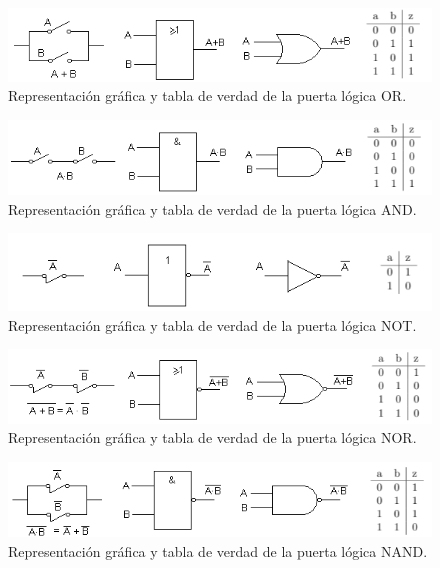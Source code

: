 \documentclass[a4paper, 11pt, titlepage]{article}
\begin{document}
    \begin{figure}[htp]
      \centering
      \includegraphics[width=1\textwidth]{resources/boole-or.png}
      \caption{Representación gráfica y tabla de verdad de la puerta lógica OR.}
      \label{boole-or}
    \end{figure}

    \begin{figure}[htp]
      \centering
      \includegraphics[width=1\textwidth]{resources/boole-and.png}
      \caption{Representación gráfica y tabla de verdad de la puerta lógica AND.}
      \label{boole-and}
    \end{figure}

    \begin{figure}[htp]
      \centering
      \includegraphics[width=1\textwidth]{resources/boole-not.png}
      \caption{Representación gráfica y tabla de verdad de la puerta lógica NOT.}
      \label{boole-not}
    \end{figure}

    \begin{figure}[htp]
      \centering
      \includegraphics[width=1\textwidth]{resources/boole-nor.png}
      \caption{Representación gráfica y tabla de verdad de la puerta lógica NOR.}
      \label{boole-nor}
    \end{figure}

    \begin{figure}[htp]
      \centering
      \includegraphics[width=1\textwidth]{resources/boole-nand.png}
      \caption{Representación gráfica y tabla de verdad de la puerta lógica NAND.}
      \label{boole-nand}
    \end{figure}
\end{document}
